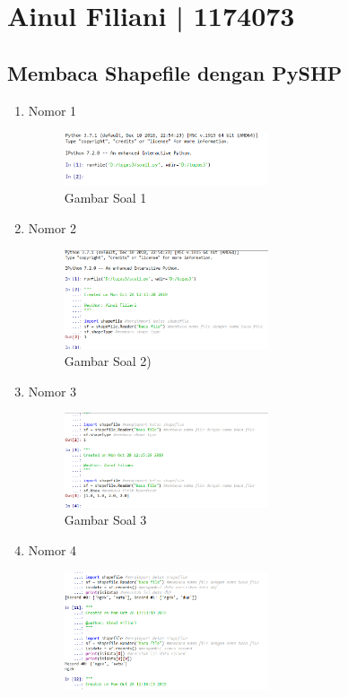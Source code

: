 \section{Ainul Filiani | 1174073}
\subsection{Membaca Shapefile dengan PySHP}
\begin{enumerate}
 \item Nomor 1
 
 \begin{figure}[H]
  \includegraphics[width=6cm]{figures/Tugas3/1174073/no1.png}
  \centering
  \caption{Gambar Soal 1}
 \end{figure}
 \item Nomor 2
 
 \begin{figure}[H]
  \includegraphics[width=6cm]{figures/Tugas3/1174073/no2.png}
  \centering
  \caption{Gambar Soal 2)}
 \end{figure}
 \item Nomor 3
 
 \begin{figure}[H]
  \includegraphics[width=6cm]{figures/Tugas3/1174073/no3.png}
  \centering
  \caption{Gambar Soal 3}
 \end{figure}
 \item Nomor 4
 
 \begin{figure}[H]
  \includegraphics[width=6cm]{figures/Tugas3/1174073/no4.png}

\end{figure}
\end{enumerate}
